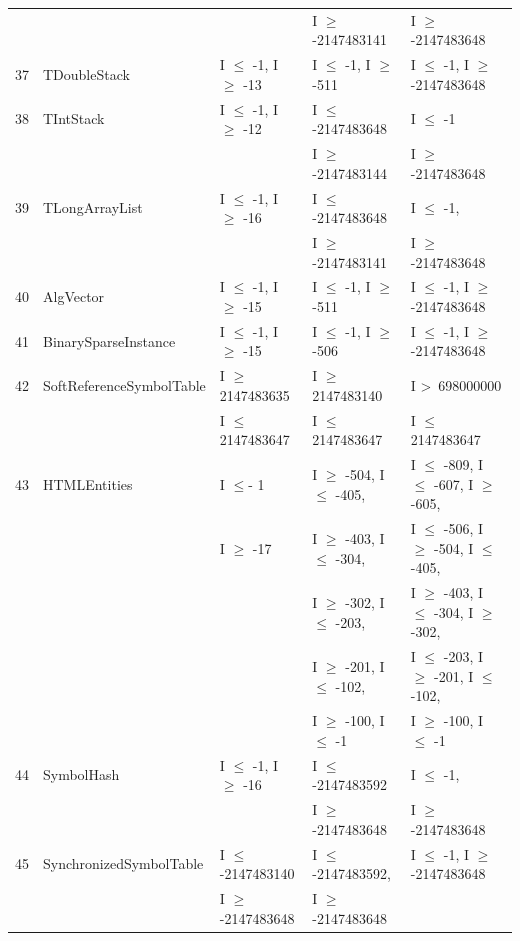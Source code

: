 {\begin{longtable}{|l|l|l|l|l|}
	&							&								& I $\ge$ -2147483141			& I $\ge$ -2147483648				\\
37	& TDoubleStack				& I $\le$ -1, I $\ge$ -13			& I $\le$ -1, I $\ge$ -511			& I $\le$ -1, I $\ge$ -2147483648	\\ 
38	& TIntStack					& I $\le$ -1, I $\ge$ -12			& I $\le$ -2147483648		 	& I $\le$ -1 							\\ 
	&							&								& I $\ge$ -2147483144			& I $\ge$ -2147483648				\\
39	& TLongArrayList				& I $\le$ -1, I $\ge$ -16			& I $\le$ -2147483648 			& I $\le$ -1, 							\\ 
	&							&								& I $\ge$ -2147483141			& I $\ge$ -2147483648				\\
40	& AlgVector					& I $\le$ -1, I $\ge$ -15			& I $\le$ -1, I $\ge$ -511			& I $\le$ -1, I $\ge$ -2147483648	\\ 
41	& BinarySparseInstance		& I $\le$ -1, I $\ge$ -15			& I $\le$ -1, I $\ge$ -506			& I $\le$ -1, I $\ge$ -2147483648	\\ 
42	& SoftReferenceSymbolTable	& I $\ge$ 2147483635			& I $\ge$ 2147483140			& I \textgreater~698000000					\\ 
	&                                             & I $\le$ 2147483647			& I $\le$ 2147483647			& I $\le$ 2147483647					\\
43	& HTMLEntities				& I $\le$- 1						& I $\ge$ -504, I $\le$ -405,		& I $\le$ -809, I $\le$ -607, I $\ge$ -605,    		\\ 
	&                         			& I $\ge$ -17					& I $\ge$ -403, I $\le$ -304, 		& I $\le$ -506, I $\ge$ -504, I $\le$ -405,		 \\	
	&                         			& 								& I $\ge$ -302, I $\le$ -203,		& I $\ge$ -403, I $\le$ -304, I $\ge$ -302,		 \\	
	&                        				& 								& I $\ge$ -201, I $\le$ -102, 		& I $\le$ -203, I $\ge$ -201, I $\le$ -102,		 \\	
	&                         			& 								& I $\ge$ -100, I $\le$ -1			& I $\ge$ -100, I $\le$ -1				 			 \\	
44	& SymbolHash				& I $\le$ -1,  I $\ge$ -16			& I $\le$ -2147483592			& I $\le$ -1, 							\\ 
	&							&								& I $\ge$ -2147483648			& I $\ge$ -2147483648				\\
45	& SynchronizedSymbolTable	& I $\le$ -2147483140			& I $\le$ -2147483592,			& I $\le$ -1, I $\ge$ -2147483648	\\ 
	&                                             & I $\ge$ -2147483648			& I $\ge$ -2147483648 			&  			   								\\

\end{longtable}}
